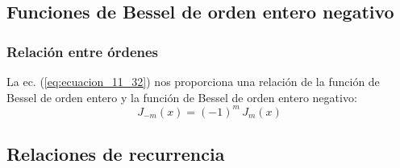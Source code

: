 \documentclass[12pt]{beamer}
\begin{document}
\subsection{Funciones de Bessel de orden entero negativo}

\begin{frame}
\frametitle{Relación entre órdenes}
La ec. (\ref{eq:ecuacion_11_32}) nos proporciona una relación de la función de Bessel de orden entero y la función de Bessel de orden entero negativo:
\pause
\begin{equation}
J_{-m} (x) = (-1)^{m} \, J_{m} (x)
\label{eq:ecuacion_27_14}
\end{equation}
\end{frame}

\subsection{Relaciones de recurrencia}
\end{document}
